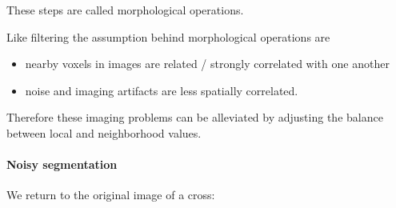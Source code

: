 \documentclass[letterpaper,10pt,english]{sphinxmanual}
\begin{document}
\sphinxAtStartPar
These steps are called morphological operations.

\sphinxAtStartPar
Like filtering the assumption behind morphological operations are
\begin{itemize}
\item {} 
\sphinxAtStartPar
nearby voxels in  images are related / strongly correlated with one another

\item {} 
\sphinxAtStartPar
noise and imaging artifacts are less spatially correlated.

\end{itemize}

\sphinxAtStartPar
Therefore these imaging problems can be alleviated by adjusting the balance between local and neighborhood values.


\paragraph{Noisy segmentation}
\label{\detokenize{04-BasicSegmentation_Part2:noisy-segmentation}}
\sphinxAtStartPar
We return to the original image of a cross:
\end{document}
